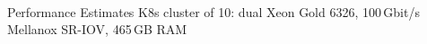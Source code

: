 \documentclass[aspectratio=169]{beamer}
\begin{document}
\begin{frame}{Performance Estimates}
K8s cluster of 10: dual Xeon\textsuperscript{\textregistered} Gold 6326, 100\,Gbit/s Mellanox SR-IOV, 465\,GB RAM
\begin{minipage}[t]{0.6\textwidth}



\end{minipage}
\end{frame}
\end{document}
